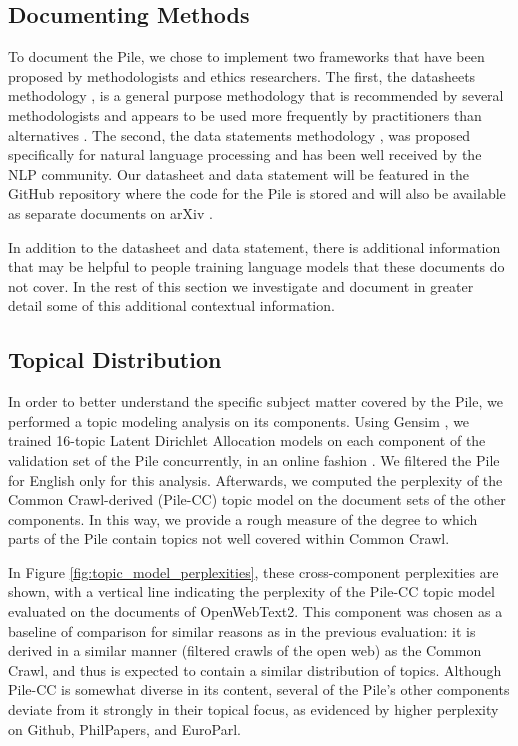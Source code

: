 \subsection{Documenting Methods}

To document the Pile, we chose to implement two frameworks that have been proposed by methodologists and ethics researchers. The first, the datasheets methodology \citep{datasheets}, is a general purpose methodology that is recommended by several methodologists \citep{best-practice1,best-practice2} and appears to be used more frequently by practitioners than alternatives \citep{datasheet1,datasheet2,datasheet3}. The second, the data statements methodology \citep{datastatement}, was proposed specifically for natural language processing and has been well received by the NLP community. Our datasheet and data statement will be featured in the GitHub repository where the code for the Pile is stored and will also be available as separate documents on arXiv \citep{pile-datasheet,pile-datastatement}.

In addition to the datasheet and data statement, there is additional information that may be helpful to people training language models that these documents do not cover. In the rest of this section we investigate and document in greater detail some of this additional contextual information.

\subsection{Topical Distribution}

In order to better understand the specific subject matter covered by the Pile, we performed a topic modeling analysis on its components. Using Gensim \citep{gensim}, we trained 16-topic Latent Dirichlet Allocation \citep{lda} models on each component of the validation set of the Pile concurrently, in an online fashion \citep{onlinelda}. We filtered the Pile for English only for this analysis. Afterwards, we computed the perplexity of the Common Crawl-derived (Pile-CC) topic model on the document sets of the other components. In this way, we provide a rough measure of the degree to which parts of the Pile contain topics not well covered within Common Crawl.

In Figure \ref{fig:topic_model_perplexities}, these cross-component perplexities are shown, with a vertical line indicating the perplexity of the Pile-CC topic model evaluated on the documents of OpenWebText2. This component was chosen as a baseline of comparison for similar reasons as in the previous evaluation: it is derived in a similar manner (filtered crawls of the open web) as the Common Crawl, and thus is expected to contain a similar distribution of topics. Although Pile-CC is somewhat diverse in its content, several of the Pile's other components deviate from it strongly in their topical focus, as evidenced by higher perplexity on Github, PhilPapers, and EuroParl.

